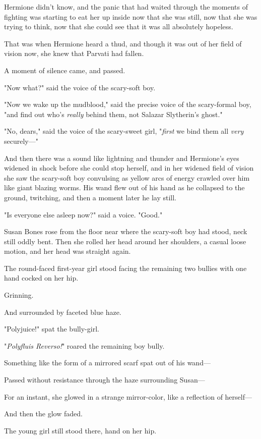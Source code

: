 Hermione didn't know, and the panic that had waited through the moments of
fighting was starting to eat her up inside now that she was still, now that she
was trying to think, now that she could see that it was all absolutely hopeless.

That was when Hermione heard a thud, and though it was out of her field of
vision now, she knew that Parvati had fallen.

A moment of silence came, and passed.

"Now what?" said the voice of the scary-soft boy.

"Now we wake up the mudblood," said the precise voice of the scary-formal boy,
"and find out who's \emph{really} behind them, not Salazar Slytherin's ghost."

"No, dears," said the voice of the scary-sweet girl, "\emph{first} we bind them
all \emph{very} securely—"

And then there was a sound like lightning and thunder and Hermione's eyes
widened in shock before she could stop herself, and in her widened field of
vision she saw the scary-soft boy convulsing as yellow arcs of energy crawled
over him like giant blazing worms. His wand flew out of his hand as he
collapsed to the ground, twitching, and then a moment later he lay still.

"Is everyone else asleep now?" said a voice. "Good."

Susan Bones rose from the floor near where the scary-soft boy had stood, neck
still oddly bent. Then she rolled her head around her shoulders, a casual loose
motion, and her head was straight again.

The round-faced first-year girl stood facing the remaining two bullies with one
hand cocked on her hip.

Grinning.

And surrounded by faceted blue haze.

"Polyjuice!" spat the bully-girl.

"\emph{Polyfluis Reverso!}" roared the remaining boy bully.

Something like the form of a mirrored scarf spat out of his wand—

Passed without resistance through the haze surrounding Susan—

For an instant, she glowed in a strange mirror-color, like a reflection of
herself—

And then the glow faded.

The young girl still stood there, hand on her hip.

